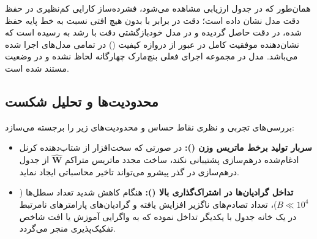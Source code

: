 همان‌طور که در جدول ارزیابی مشاهده می‌شود، فشرده‌ساز  کارایی کم‌نظیری در حفظ دقت مدل نشان داده است؛ دقت در  برابر با  بدون هیچ افتی نسبت به خط پایه حفظ شده، در  دقت  حاصل گردیده و در مدل خودبازگشتی  دقت با رشد  به  رسیده است که نشان‌دهنده موفقیت کامل در عبور از دروازه کیفیت () در تمامی مدل‌های اجرا شده می‌باشد. مدل  در مجموعه اجرای فعلی بنچ‌مارک چهارگانه لحاظ نشده و در وضعیت  مستند شده است.

\subsection{محدودیت‌ها و تحلیل شکست}
بررسی‌های تجربی و نظری نقاط حساس و محدودیت‌های زیر را برجسته می‌سازد:
\begin{itemize}
    \item \textbf{سربار تولید برخط ماتریس وزن ():} در صورتی که سخت‌افزار از شتاب‌دهنده کرنل ادغام‌شده درهم‌سازی پشتیبانی نکند، ساخت مجدد ماتریس متراکم $\hat{\mathbf{W}}$ از جدول درهم‌سازی در گذر پیشرو می‌تواند تاخیر محاسباتی ایجاد نماید.
    \item \textbf{تداخل گرادیان‌ها در اشتراک‌گذاری بالا ():} هنگام کاهش شدید تعداد سطل‌ها ($B \ll 10^4$)، تعداد تصادم‌های ناگزیر افزایش یافته و گرادیان‌های پارامترهای نامرتبط در یک خانه جدول با یکدیگر تداخل نموده که به واگرایی آموزش یا افت شاخص تفکیک‌پذیری منجر می‌گردد.
\end{itemize}
